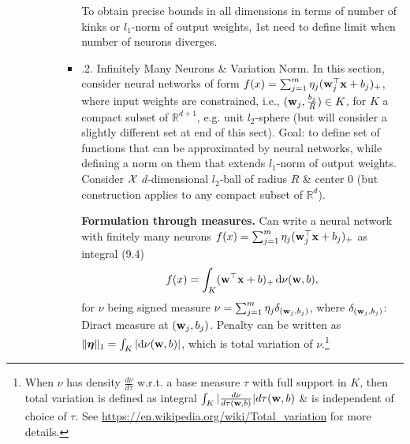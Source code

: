 \documentclass{article}
\begin{document}
\begin{enumerate}
\begin{itemize}
\begin{itemize}
\begin{itemize}
				To obtain precise bounds in all dimensions in terms of number of kinks or $l_1$-norm of output weights, 1st need to define limit when number of neurons diverges.				
				\item {.2. Infinitely Many Neurons \& Variation Norm.} In this section, consider neural networks of form $f(x) = \sum_{j=1}^m \eta_j({\bf w}_j^\top{\bf x} + b_j)_+$, where input weights are constrained, i.e., $({\bf w}_j,\frac{b_j}{R})\in K$, for $K$ a compact subset of $\mathbb{R}^{d+1}$, e.g. unit $l_2$-sphere (but will consider a slightly different set at end of this sect). Goal: to define set of functions that can be approximated by neural networks, while defining a norm on them that extends $l_1$-norm of output weights. Consider ${\cal X}$ $d$-dimensional $l_2$-ball of radius $R$ \& center 0 (but construction applies to any compact subset of $\mathbb{R}^d$).
				
				{\bf Formulation through measures.} Can write a neural network with finitely many neurons $f(x) = \sum_{j=1}^m \eta_j({\bf w}_j^\top{\bf x} + b_j)_+$ as integral (9.4)
				\begin{equation}
					f(x) = \int_K ({\bf w}^\top{\bf x} + b)_+\,{\rm d}\nu({\bf w},b),
				\end{equation}
				for $\nu$ being signed measure $\nu = \sum_{j=1}^m \eta_j\delta_{({\bf w}_j,b_j)}$, where $\delta_{({\bf w}_j,b_j)}$: Diract measure at $({\bf w}_j,b_j)$. Penalty can be written as $\|\boldsymbol{\eta}\|_1 = \int_K |{\rm d}\nu({\bf w},b)|$, which is total variation of $\nu$.\footnote{When $\nu$ has density $\frac{d\nu}{d\tau}$ w.r.t. a base measure $\tau$ with full support in $K$, then total variation is defined as integral $\int_K |\frac{d\nu}{d\tau({\bf w},b)}|d\tau({\bf w},b)$ \& is independent of choice of $\tau$. See \url{https://en.wikipedia.org/wiki/Total_variation} for more details.}
				

\end{itemize}
\end{itemize}
\end{itemize}
\end{enumerate}
\end{document}
